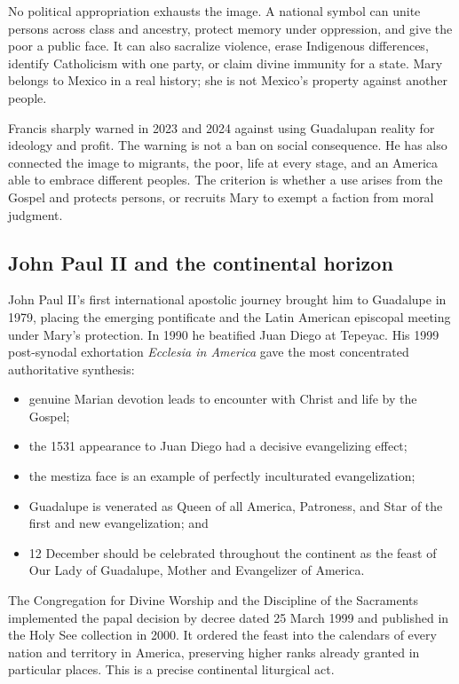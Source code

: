 No political appropriation exhausts the image. A national symbol can unite persons across class and ancestry, protect memory under oppression, and give the poor a public face. It can also sacralize violence, erase Indigenous differences, identify Catholicism with one party, or claim divine immunity for a state. Mary belongs to Mexico in a real history; she is not Mexico's property against another people.

Francis sharply warned in 2023 and 2024 against using Guadalupan reality for ideology and profit. The warning is not a ban on social consequence. He has also connected the image to migrants, the poor, life at every stage, and an America able to embrace different peoples. The criterion is whether a use arises from the Gospel and protects persons, or recruits Mary to exempt a faction from moral judgment.

\subsection{John Paul II and the continental horizon}

John Paul II's first international apostolic journey brought him to Guadalupe in 1979, placing the emerging pontificate and the Latin American episcopal meeting under Mary's protection. In 1990 he beatified Juan Diego at Tepeyac. His 1999 post-synodal exhortation \emph{Ecclesia in America} gave the most concentrated authoritative synthesis:

\begin{itemize}
  \item genuine Marian devotion leads to encounter with Christ and life by the Gospel;
  \item the 1531 appearance to Juan Diego had a decisive evangelizing effect;
  \item the mestiza face is an example of perfectly inculturated evangelization;
  \item Guadalupe is venerated as Queen of all America, Patroness, and Star of the first and new evangelization; and
  \item 12 December should be celebrated throughout the continent as the feast of Our Lady of Guadalupe, Mother and Evangelizer of America.
\end{itemize}

The Congregation for Divine Worship and the Discipline of the Sacraments implemented the papal decision by decree dated 25 March 1999 and published in the Holy See collection in 2000. It ordered the feast into the calendars of every nation and territory in America, preserving higher ranks already granted in particular places. This is a precise continental liturgical act.

